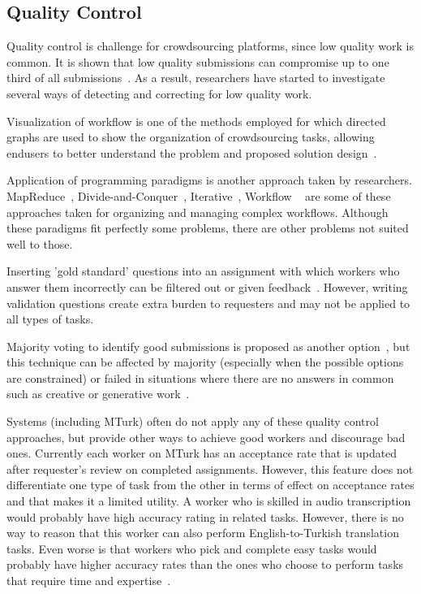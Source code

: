 \subsection{Quality Control}
Quality control is challenge for crowdsourcing platforms, since low quality work 
is common. It is shown that low quality submissions can compromise up to one third 
of all submissions~\cite{Bernstein2010}. As a result, researchers have started to 
investigate several ways of detecting and correcting for low quality work.

Visualization of workflow is one of the methods employed for which directed graphs 
are used to show the organization of crowdsourcing tasks, allowing endusers 
to better understand the problem and proposed solution design~\cite{Kulkarni2012, Kittur2012}.

Application of programming paradigms is another approach taken by 
researchers. MapReduce~\cite{Kittur2011, Ahmad2011}, 
Divide-and-Conquer~\cite{Kulkarni2012}, 
Iterative~\cite{Little2009}, 
Workflow ~\cite{Kokciyan2012} are some of these approaches taken for 
organizing and managing complex workflows. Although these paradigms 
fit perfectly some problems, there are other problems not suited well to those.

Inserting 'gold standard' questions into an assignment with which workers 
who answer them incorrectly can be filtered out or given feedback~\cite{Burch2009}. 
However, writing validation questions create extra burden to requesters and 
may not be applied to all types of tasks.

Majority voting to identify good submissions is proposed as another 
option~\cite{Burch2009, Bernstein2010}, but this technique can be affected 
by majority (especially when the possible options are constrained) or failed in 
situations where there are no answers in common such as creative or generative 
work~\cite{Rzeszotarski2012}.

Systems (including MTurk) often do not apply any of these quality control approaches, 
but provide other ways to achieve good workers and discourage bad ones. 
Currently each worker on MTurk has an acceptance rate that is updated after 
requester's review on completed assignments. However, this feature does not 
differentiate one type of task from the other in terms of effect on acceptance rates 
and that makes it a limited utility. A worker who is skilled in audio transcription would 
probably have high accuracy rating in related tasks. However, there is no way to 
reason that this worker can also perform English-to-Turkish translation tasks. 
Even worse is that workers who pick and complete easy tasks would probably 
have higher accuracy rates than the ones who choose to perform tasks that 
require time and expertise~\cite{Barowy2012}.

